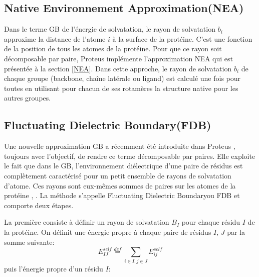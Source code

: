 \subsection{\og Native Environnement Approximation\fg (NEA)}

Dans le terme GB de l'énergie de solvatation, le rayon de solvatation $b_i$ approxime la distance de l'atome $i$ à la surface de la protéine. C'est une fonction de la position de tous les atomes de la protéine. Pour que ce rayon soit décomposable par paire, Proteus implémente l'approximation  NEA qui est présentée à  la section \vref{NEA}. Dans cette approche, le rayon de solvatation $b_i$ de chaque groupe (backbone, chaîne latérale ou ligand) est calculé une fois pour toutes en utilisant pour chacun de ses rotamères la structure native pour les autres groupes.

\subsection{\og Fluctuating Dielectric Boundary\fg (FDB)}
\label{sec:FDB}
Une nouvelle approximation GB a récemment été introduite dans Proteus \cite{Villa17}, toujours avec l'objectif, de rendre ce terme décomposable par paires. Elle exploite le fait que dans le GB, l'environnement diélectrique d'une paire de résidus est complètement caractérisé pour un petit ensemble de rayons de solvatation d'atome. Ces rayons sont eux-mêmes sommes de paires sur les atomes de la protéine \cite{Hawkins95}, \cite{Schaefer96}. La méthode s'appelle Fluctuating Dielectric Boundary\fg ou FDB et comporte deux étapes.

La première consiste à définir un rayon de solvatation $B_I$ pour chaque résidu $I$ de la protéine. On définit une énergie propre à chaque paire de résidus $I$, $J$ par la somme suivante:
\begin{equation}
  E_{IJ}^{self} \stackrel{def}{=} \sum_{i\in I,j\in J} E_{ij}^{self}
\end{equation}
puis l'énergie propre d'un résidu $I$:

